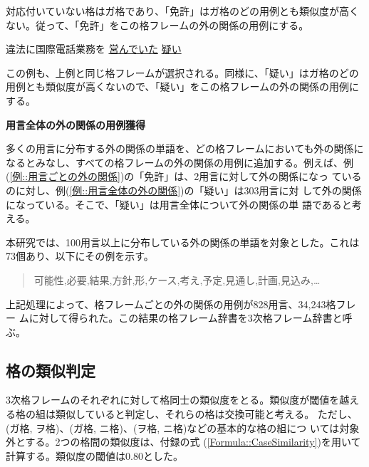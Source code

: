 \documentclass[fleqn]{nlp}
\begin{document}
\noindent
対応付いていない格はガ格であり、「免許」はガ格のどの用例とも類似度が高く
ない。従って、「免許」をこの格フレームの外の関係の用例にする。

\begin{exe}
 \ex 違法に国際電話業務を \underline{\underline{営んでいた}} \underline{疑い}\label{例::用言全体の外の関係}
\end{exe}

\noindent
この例も、上例と同じ格フレームが選択される。同様に、「疑い」はガ格のどの
用例とも類似度が高くないので、「疑い」をこの格フレームの外の関係の用例に
する。

\vspace*{1.5ex}

\noindent
\textbf{用言全体の外の関係の用例獲得}

多くの用言に分布する外の関係の単語を、どの格フレームにおいても外の関係に
なるとみなし、すべての格フレームの外の関係の用例に追加する。例えば、例
(\ref {例::用言ごとの外の関係})の「免許」は、2用言に対して外の関係になっ
ているのに対し、例(\ref{例::用言全体の外の関係})の「疑い」は303用言に対
して外の関係になっている。そこで、「疑い」は用言全体について外の関係の単
語であると考える。

本研究では、100用言以上に分布している外の関係の単語を対象とした。これは
73個あり、以下にその例を示す。

\begin{quote}
 可能性,必要,結果,方針,形,ケース,考え,予定,見通し,計画,見込み,…
\end{quote}

\vspace*{2ex}

上記処理によって、格フレームごとの外の関係の用例が828用言、34,243格フレー
ムに対して得られた。この結果の格フレーム辞書を3次格フレーム辞書と呼ぶ。


\subsection{格の類似判定}

3次格フレームのそれぞれに対して格同士の類似度をとる。類似度が閾値を越え
る格の組は類似していると判定し、それらの格は交換可能と考える。
ただし、(ガ格, ヲ格)、(ガ格, ニ格)、(ヲ格, ニ格)などの基本的な格の組につ
いては対象外とする。2つの格間の類似度は、付録の式
(\ref{Formula::CaseSimilarity})を用いて計算する。類似度の閾値は0.80とした。
\end{document}
